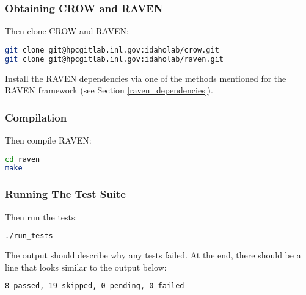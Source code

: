 \subsubsection{Obtaining CROW and RAVEN}
Then clone CROW and RAVEN:

\begin{lstlisting}[language=bash]
git clone git@hpcgitlab.inl.gov:idaholab/crow.git
git clone git@hpcgitlab.inl.gov:idaholab/raven.git
\end{lstlisting}

Install the RAVEN dependencies via one of the methods mentioned for
the RAVEN framework (see Section \ref{raven_dependencies}).

\subsubsection{Compilation}

Then compile RAVEN:

\begin{lstlisting}[language=bash]
cd raven
make
\end{lstlisting}

\subsubsection{Running The Test Suite}
Then run the tests:

\begin{lstlisting}[language=bash]
./run_tests
\end{lstlisting}

The output should describe why any tests failed.
%
At the end, there should be a line that looks similar to the output below:
\begin{lstlisting}[language=bash]
8 passed, 19 skipped, 0 pending, 0 failed
\end{lstlisting}
